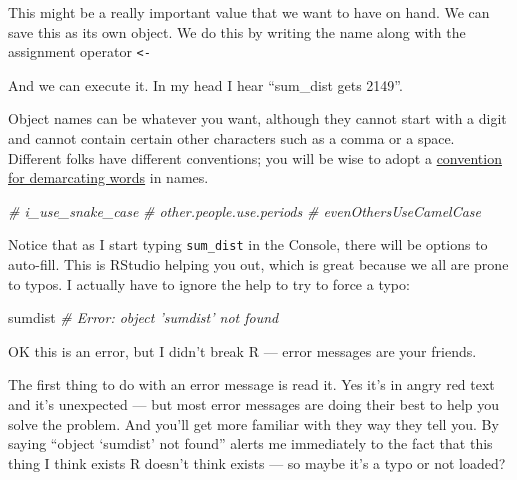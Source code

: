 \documentclass[]{book}
\newenvironment{Shaded}{\begin{snugshade}}{\end{snugshade}}
\newcommand{\CommentTok}[1]{\textcolor[rgb]{0.56,0.35,0.01}{\textit{#1}}}
\newcommand{\KeywordTok}[1]{\textcolor[rgb]{0.13,0.29,0.53}{\textbf{#1}}}
\newcommand{\NormalTok}[1]{#1}
\newcommand{\OperatorTok}[1]{\textcolor[rgb]{0.81,0.36,0.00}{\textbf{#1}}}
\newcommand{\StringTok}[1]{\textcolor[rgb]{0.31,0.60,0.02}{#1}}
\begin{document}
This might be a really important value that we want to have on hand. We can save this as its own object. We do this by writing the name along with the assignment operator \texttt{\textless{}-}

\begin{Shaded}
\end{Shaded}

And we can execute it. In my head I hear ``sum\_dist gets 2149''.

Object names can be whatever you want, although they cannot start with a digit and cannot contain certain other characters such as a comma or a space. Different folks have different conventions; you will be wise to adopt a \href{http://en.wikipedia.org/wiki/Snake_case}{convention for demarcating words} in names.

\begin{Shaded}
\begin{Highlighting}[]
\CommentTok{# i_use_snake_case}
\CommentTok{# other.people.use.periods}
\CommentTok{# evenOthersUseCamelCase}
\end{Highlighting}
\end{Shaded}

Notice that as I start typing \texttt{sum\_dist} in the Console, there will be options to auto-fill. This is RStudio helping you out, which is great because we all are prone to typos. I actually have to ignore the help to try to force a typo:

\begin{Shaded}
\begin{Highlighting}[]
\NormalTok{sumdist}
\CommentTok{# Error: object 'sumdist' not found}
\end{Highlighting}
\end{Shaded}

OK this is an error, but I didn't break R --- error messages are your friends.

The first thing to do with an error message is read it. Yes it's in angry red text and it's unexpected --- but most error messages are doing their best to help you solve the problem. And you'll get more familiar with they way they tell you. By saying ``object `sumdist' not found'' alerts me immediately to the fact that this thing I think exists R doesn't think exists --- so maybe it's a typo or not loaded?
\end{document}
